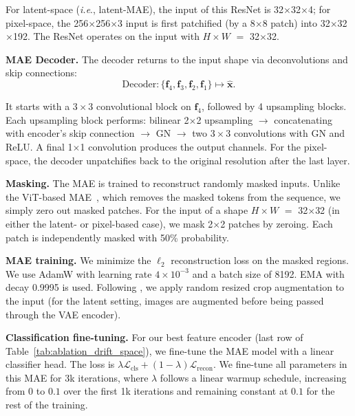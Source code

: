 \documentclass{article}
\renewcommand{\paragraph}[1]{\vspace{.05em}\noindent\textbf{#1}}
\def\onedot{.}
\def\ie{\emph{i.e}\onedot} \def\Ie{\emph{I.e}\onedot}
\theoremstyle{plain}
\theoremstyle{definition}
\theoremstyle{remark}
\begin{document}
For latent-space (\ie, latent-MAE), the input of this ResNet is 32$\times$32$\times$4; for pixel-space, the 256$\times$256$\times$3 input is first patchified (by a 8$\times$8 patch) into 32$\times$32$\times$192. The ResNet operates on the input with $H{\times}W$ $=$ 32$\times$32.

\paragraph{MAE Decoder.}
The decoder returns to the input shape via deconvolutions and skip connections:
\[
\text{Decoder}: \{\mathbf{f}_4, \mathbf{f}_3, \mathbf{f}_2, \mathbf{f}_1\} \mapsto \hat{\mathbf{x}}.
\]

It starts with a $3{\times}3$ convolutional block on $\mathbf{f}_4$, followed by 4 upsampling blocks.
Each upsampling block performs: bilinear 2${\times}$2 upsampling $\to$ concatenating with encoder's skip connection $\to$ GN $\to$ two $3{\times}3$ convolutions with GN and ReLU.
A final 1${\times}$1 convolution produces the output channels. For the pixel-space, the decoder unpatchifies back to the original resolution after the last layer.

\paragraph{Masking.}
The MAE is trained to reconstruct randomly masked inputs.
Unlike the ViT-based MAE~\citep{he2022masked}, which removes the masked tokens from the sequence, we simply zero out masked patches.
For the input of a shape $H{\times}W$ $=$ 32$\times$32 (in either the latent- or pixel-based case), we mask 2${\times}$2 patches by zeroing.
Each patch is independently masked with 50\% probability.

\paragraph{MAE training.}
We minimize the $\ell_2$ reconstruction loss on the masked regions.
We use AdamW \cite{Loshchilov2019} with learning rate $4{\times}10^{-3}$ and a batch size of 8192. EMA with decay 0.9995 is used.
Following \cite{he2022masked}, we apply random resized crop augmentation to the input (for the latent setting, images are augmented before being passed through the VAE encoder).

\paragraph{Classification fine-tuning.}
For our best feature encoder (last row of Table~\ref{tab:ablation_drift_space}), we fine-tune the MAE model with a linear classifier head.
The loss is $\lambda \mathcal{L}_{\text{cls}} + (1-\lambda)\mathcal{L}_{\text{recon}}$. We fine-tune all parameters in this MAE for 3k iterations, where $\lambda$ follows a linear warmup schedule, increasing from $0$ to $0.1$ over the first 1k iterations and remaining constant at $0.1$ for the rest of the training.
\end{document}
